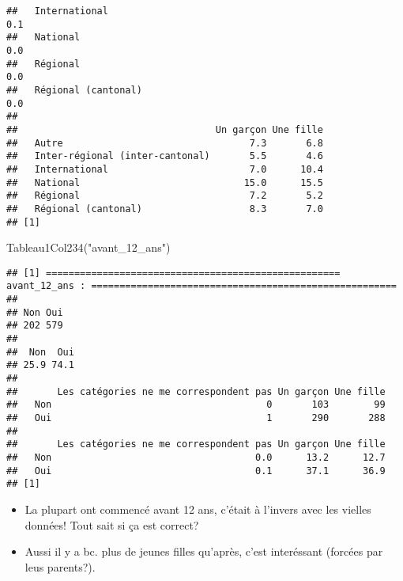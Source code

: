 \documentclass[
]{article}
\newenvironment{Shaded}{\begin{snugshade}}{\end{snugshade}}
\newcommand{\FunctionTok}[1]{\textcolor[rgb]{0.00,0.00,0.00}{#1}}
\newcommand{\NormalTok}[1]{#1}
\newcommand{\StringTok}[1]{\textcolor[rgb]{0.31,0.60,0.02}{#1}}
\providecommand{\tightlist}{%
  \setlength{\itemsep}{0pt}\setlength{\parskip}{0pt}}
\begin{document}
\begin{verbatim}
##   International                                                      0.1
##   National                                                           0.0
##   Régional                                                           0.0
##   Régional (cantonal)                                                0.0
##                                  
##                                   Un garçon Une fille
##   Autre                                 7.3       6.8
##   Inter-régional (inter-cantonal)       5.5       4.6
##   International                         7.0      10.4
##   National                             15.0      15.5
##   Régional                              7.2       5.2
##   Régional (cantonal)                   8.3       7.0
## [1]
\end{verbatim}

\begin{Shaded}
\begin{Highlighting}[]
\FunctionTok{Tableau1Col234}\NormalTok{(}\StringTok{"avant\_12\_ans"}\NormalTok{)}
\end{Highlighting}
\end{Shaded}

\begin{verbatim}
## [1] ==================================================== avant_12_ans : ======================================================
## 
## Non Oui 
## 202 579 
## 
##  Non  Oui 
## 25.9 74.1 
##      
##       Les catégories ne me correspondent pas Un garçon Une fille
##   Non                                      0       103        99
##   Oui                                      1       290       288
##      
##       Les catégories ne me correspondent pas Un garçon Une fille
##   Non                                    0.0      13.2      12.7
##   Oui                                    0.1      37.1      36.9
## [1]
\end{verbatim}

\begin{itemize}
\tightlist
\item
  La plupart ont commencé avant 12 ans, c'était à l'invers avec les
  vielles données! Tout sait si ça est correct?
\item
  Aussi il y a bc. plus de jeunes filles qu'après, c'est interéssant
  (forcées par leus parents?).
\end{itemize}
\end{document}
